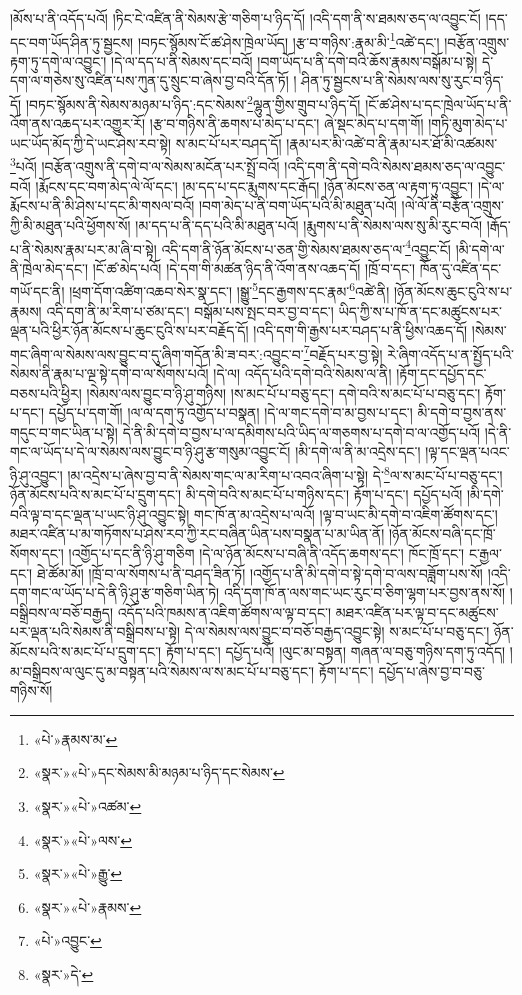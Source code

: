 །མོས་པ་ནི་འདོད་པའོ། །ཏིང་ངེ་འཛིན་ནི་སེམས་རྩེ་གཅིག་པ་ཉིད་དོ། །འདི་དག་ནི་ས་ཐམས་ཅད་ལ་འབྱུང་ངོ། །དད་དང་བག་ཡོད་ཤིན་ཏུ་སྦྱངས། །བཏང་སྙོམས་ངོ་ཚ་ཤེས་ཁྲེལ་ཡོད། །རྩ་བ་གཉིས་:རྣམ་མི་\footnote{«པེ་»རྣམས་མ་}འཚེ་དང་། །བརྩོན་འགྲུས་རྟག་ཏུ་དགེ་ལ་འབྱུང་། །དེ་ལ་དད་པ་ནི་སེམས་དང་བའོ། །བག་ཡོད་པ་ནི་དགེ་བའི་ཆོས་རྣམས་བསྒོམ་པ་སྟེ། དེ་དག་ལ་གཅེས་སུ་འཛིན་པས་ཀུན་དུ་སྲུང་བ་ཞེས་བྱ་བའི་དོན་ཏོ། །
ཤིན་ཏུ་སྦྱངས་པ་ནི་སེམས་ལས་སུ་རུང་བ་ཉིད་དོ། །བཏང་སྙོམས་ནི་སེམས་མཉམ་པ་ཉིད་:དང་སེམས་\footnote{«སྣར་»«པེ་»དང་སེམས་མི་མཉམ་པ་ཉིད་དང་སེམས་}ལྷུན་གྱིས་གྲུབ་པ་ཉིད་དོ། །ངོ་ཚ་ཤེས་པ་དང་ཁྲེལ་ཡོད་པ་ནི་འོག་ནས་འཆད་པར་འགྱུར་རོ། །རྩ་བ་གཉིས་ནི་ཆགས་པ་མེད་པ་དང་། ཞེ་སྡང་མེད་པ་དག་གོ། །གཏི་མུག་མེད་པ་ཡང་ཡོད་མོད་ཀྱི་དེ་ཡང་ཤེས་རབ་སྟེ། ས་མང་པོ་པར་བཤད་དོ། །རྣམ་པར་མི་འཚེ་བ་ནི་རྣམ་པར་ཐོ་མི་འཚམས་\footnote{«སྣར་»«པེ་»འཚམ་}པའོ། །བརྩོན་འགྲུས་ནི་དགེ་བ་ལ་སེམས་མངོན་པར་སྤྲོ་བའོ། །འདི་དག་ནི་དགེ་བའི་སེམས་ཐམས་ཅད་ལ་འབྱུང་བའོ། །རྨོངས་དང་བག་མེད་ལེ་ལོ་དང་། །མ་དད་པ་དང་རྨུགས་དང་རྒོད། །ཉོན་མོངས་ཅན་ལ་རྟག་ཏུ་འབྱུང་། །དེ་ལ་རྨོངས་པ་ནི་མི་ཤེས་པ་དང་མི་གསལ་བའོ། །བག་མེད་པ་ནི་བག་ཡོད་པའི་མི་མཐུན་པའོ། །ལེ་ལོ་ནི་བརྩོན་འགྲུས་ཀྱི་མི་མཐུན་པའི་ཕྱོགས་སོ། །མ་དད་པ་ནི་དད་པའི་མི་མཐུན་པའོ། །རྨུགས་པ་ནི་སེམས་ལས་སུ་མི་རུང་བའོ། །རྒོད་པ་ནི་སེམས་རྣམ་པར་མ་ཞི་བ་སྟེ། འདི་དག་ནི་ཉོན་མོངས་པ་ཅན་གྱི་སེམས་ཐམས་ཅད་ལ་\footnote{«སྣར་»«པེ་»ལས་}འབྱུང་ངོ། །མི་དགེ་ལ་ནི་ཁྲེལ་མེད་དང་། །ངོ་ཚ་མེད་པའོ། །དེ་དག་གི་མཚན་ཉིད་ནི་འོག་ནས་འཆད་དོ། །ཁྲོ་བ་དང་། ཁོན་དུ་འཛིན་དང་གཡོ་དང་ནི། །ཕྲག་དོག་འཚིག་འཆབ་སེར་སྣ་དང་། །སྒྱུ་\footnote{«སྣར་»«པེ་»རྒྱུ་}དང་རྒྱགས་དང་རྣམ་\footnote{«སྣར་»«པེ་»རྣམས་}འཚེ་ནི། །ཉོན་མོངས་ཆུང་ངུའི་ས་པ་རྣམས། འདི་དག་ནི་མ་རིག་པ་ཙམ་དང་། བསྒོམ་པས་སྤང་བར་བྱ་བ་དང་། ཡིད་ཀྱི་ས་པ་ཁོ་ན་དང་མཚུངས་པར་ལྡན་པའི་ཕྱིར་ཉོན་མོངས་པ་ཆུང་ངུའི་ས་པར་བརྗོད་དོ། །འདི་དག་གི་རྒྱས་པར་བཤད་པ་ནི་ཕྱིས་འཆད་དོ། །སེམས་གང་ཞིག་ལ་སེམས་ལས་བྱུང་བ་དུ་ཞིག་གདོན་མི་ཟ་བར་:འབྱུང་བ་\footnote{«པེ་»འབྱུང་}བརྗོད་པར་བྱ་སྟེ། རེ་ཞིག་འདོད་པ་ན་སྤྱོད་པའི་སེམས་ནི་རྣམ་པ་ལྔ་སྟེ་དགེ་བ་ལ་སོགས་པའོ། །དེ་ལ། འདོད་པའི་དགེ་བའི་སེམས་ལ་ནི། །རྟོག་དང་དཔྱོད་དང་བཅས་པའི་ཕྱིར། །སེམས་ལས་བྱུང་བ་ཉི་ཤུ་གཉིས། །ས་མང་པོ་པ་བཅུ་དང་། དགེ་བའི་ས་མང་པོ་པ་བཅུ་དང་། རྟོག་པ་དང་། དཔྱོད་པ་དག་གོ། །ལ་ལ་དག་ཏུ་འགྱོད་པ་བསྣན། །དེ་ལ་གང་དགེ་བ་མ་བྱས་པ་དང་། མི་དགེ་བ་བྱས་ནས་གདུང་བ་གང་ཡིན་པ་སྟེ། དེ་ནི་མི་དགེ་བ་བྱས་པ་ལ་དམིགས་པའི་ཡིད་ལ་གཅགས་པ་དགེ་བ་ལ་འགྱོད་པའོ། །དེ་ནི་གང་ལ་ཡོད་པ་དེ་ལ་སེམས་ལས་བྱུང་བ་ཉི་ཤུ་རྩ་གསུམ་འབྱུང་ངོ། །མི་དགེ་ལ་ནི་མ་འདྲེས་དང་། །ལྟ་དང་ལྡན་པའང་ཉི་ཤུ་འབྱུང་། །མ་འདྲེས་པ་ཞེས་བྱ་བ་ནི་སེམས་གང་ལ་མ་རིག་པ་འབའ་ཞིག་པ་སྟེ། དེ་\footnote{«སྣར་»དེ་}ལ་ས་མང་པོ་པ་བཅུ་དང་། ཉོན་མོངས་པའི་ས་མང་པོ་པ་དྲུག་དང་། མི་དགེ་བའི་ས་མང་པོ་པ་གཉིས་དང་། རྟོག་པ་དང་། དཔྱོད་པའོ། །མི་དགེ་བའི་ལྟ་བ་དང་ལྡན་པ་ཡང་ཉི་ཤུ་འབྱུང་སྟེ། གང་ཁོ་ན་མ་འདྲེས་པ་ལའོ། །ལྟ་བ་ཡང་མི་དགེ་བ་འཇིག་ཚོགས་དང་། མཐར་འཛིན་པ་མ་གཏོགས་པ་ཤེས་རབ་ཀྱི་རང་བཞིན་ཡིན་པས་བསྣན་པ་མ་ཡིན་ནོ། །ཉོན་མོངས་བཞི་དང་ཁྲོ་སོགས་དང་། །འགྱོད་པ་དང་ནི་ཉི་ཤུ་གཅིག །དེ་ལ་ཉོན་མོངས་པ་བཞི་ནི་འདོད་ཆགས་དང་། ཁོང་ཁྲོ་དང་། ང་རྒྱལ་དང་། ཐེ་ཚོམ་མོ། །ཁྲོ་བ་ལ་སོགས་པ་ནི་བཤད་ཟིན་ཏོ། །འགྱོད་པ་ནི་མི་དགེ་བ་སྟེ་དགེ་བ་ལས་བཟློག་པས་སོ། །འདི་དག་གང་ལ་ཡོད་པ་དེ་ནི་ཉི་ཤུ་རྩ་གཅིག་ཡིན་ཏེ། འདི་དག་ཁོ་ན་ལས་གང་ཡང་རུང་བ་ཅིག་ལྷག་པར་བྱས་ནས་སོ། །བསྒྲིབས་ལ་བཅོ་བརྒྱད། འདོད་པའི་ཁམས་ན་འཇིག་ཚོགས་ལ་ལྟ་བ་དང་། མཐར་འཛིན་པར་ལྟ་བ་དང་མཚུངས་པར་ལྡན་པའི་སེམས་ནི་བསྒྲིབས་པ་སྟེ། དེ་ལ་སེམས་ལས་བྱུང་བ་བཅོ་བརྒྱད་འབྱུང་སྟེ། ས་མང་པོ་པ་བཅུ་དང་། ཉོན་མོངས་པའི་ས་མང་པོ་པ་དྲུག་དང་། རྟོག་པ་དང་། དཔྱོད་པའོ། །ལུང་མ་བསྟན། གཞན་ལ་བཅུ་གཉིས་དག་ཏུ་འདོད། །མ་བསྒྲིབས་ལ་ལུང་དུ་མ་བསྟན་པའི་སེམས་ལ་ས་མང་པོ་པ་བཅུ་དང་། རྟོག་པ་དང་། དཔྱོད་པ་ཞེས་བྱ་བ་བཅུ་གཉིས་སོ། 